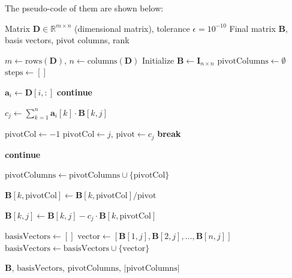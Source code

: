 \documentclass[
	11pt, %
	fleqn, %
	a4paper, %
]{LegrandOrangeBook}
\begin{document}
The pseudo-code of them are shown below:
\begin{algorithm}[H]
\caption{Linear System Solver for Buckingham $\pi$ Theorem}
\begin{algorithmic}[1]
\Require Matrix $\mathbf{D} \in \mathbb{R}^{m \times n}$ (dimensional matrix), tolerance $\epsilon = 10^{-10}$
\Ensure Final matrix $\mathbf{B}$, basis vectors, pivot columns, rank

    \State $m \gets \text{rows}(\mathbf{D})$, $n \gets \text{columns}(\mathbf{D})$
    \State Initialize $\mathbf{B} \gets \mathbf{I}_{n \times n}$ 
    \State $\text{pivotColumns} \gets \emptyset$
    \State $\text{steps} \gets []$

        \State $\mathbf{a}_i \gets \mathbf{D}[i,:]$ 
         
            \State \textbf{continue} 
        \EndIf

        \State {}
            \State $c_j \gets \sum_{k=1}^n \mathbf{a}_i[k] \cdot \mathbf{B}[k,j]$
        \EndFor

        \State {}
        \State $\text{pivotCol} \gets -1$
                \State $\text{pivotCol} \gets j$, $\text{pivot} \gets c_j$
                \State \textbf{break}
            \EndIf
        \EndFor

         \State \textbf{continue} \EndIf

        \State $\text{pivotColumns} \gets \text{pivotColumns} \cup \{\text{pivotCol}\}$

        \State {}
            \State $\mathbf{B}[k,\text{pivotCol}] \gets \mathbf{B}[k,\text{pivotCol}] / \text{pivot}$
        \EndFor

                    \State $\mathbf{B}[k,j] \gets \mathbf{B}[k,j] - c_j \cdot \mathbf{B}[k,\text{pivotCol}]$
                \EndFor
            \EndIf
        \EndFor
    \EndFor

    \State {}
    \State $\text{basisVectors} \gets []$
            \State $\text{vector} \gets [\mathbf{B}[1,j], \mathbf{B}[2,j], \ldots, \mathbf{B}[n,j]]$
            \State $\text{basisVectors} \gets \text{basisVectors} \cup \{\text{vector}\}$
        \EndIf
    \EndFor

    \State \Return $\mathbf{B}$, $\text{basisVectors}$, $\text{pivotColumns}$, $|\text{pivotColumns}|$
\EndFunction
\end{algorithmic}
\end{algorithm}
\end{document}
